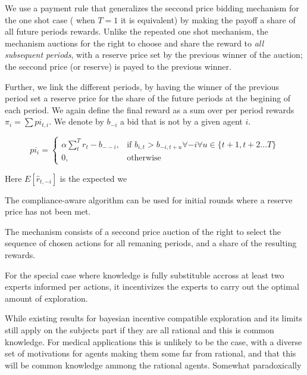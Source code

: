 We use a payment rule that generalizes the seccond price bidding mechanism for the one shot case ( when $T=1$ it is equivalent) by making the payoff a share of all future periods rewards.  Unlike the repeated one shot mechanism, the mechanism auctions for the right to choose and  share the reward to \emph{all subsequent periods}, with a reserve price set by the previous winner of the auction; the seccond price (or reserve) is payed to the previous winner.  

Further, we link the different periods, by having the winner of the previous period set a reserve price for the share of the future periods at the begining of each period. We again define the final reward as a sum over per period rewards $\pi_i = \sum pi_{t,i}$. We denote by $b_{-i}$ a bid that is not by a given agent $i$. 

\[
pi_{i} =
\begin{cases}
    \alpha \sum_t^T r_t - b_{--i}, & \text{if } b_{i,t} > b_{-i,t+u} \forall -i \forall u \in \{t+1,t+2...T\}\\
    0,              & \text{otherwise}
\end{cases}
\]


Here $E[\hat{r}_{t,-i}]$ is the expected we


The compliance-aware algorithm can be used for initial rounds where a reserve price has not been met.



The mechanism consists of a seccond price auction of the right to select the sequence of chosen actions for all remaning periods, and a share of the resulting rewards.

For the special case where knowledge is  fully substituble accross at least two experts informed per actions, it incentivizes the experts to carry out the optimal amount of exploration. 

While existing results for bayesian incentive compatible exploration and its limits still apply on the subjects part if they are all rational and this is common knowledge. For medical applications this is unlikely to be the case, with a diverse set of motivations for agents making them some far from rational, and that this will be common knowledge ammong the rational agents. Somewhat paradoxically 







